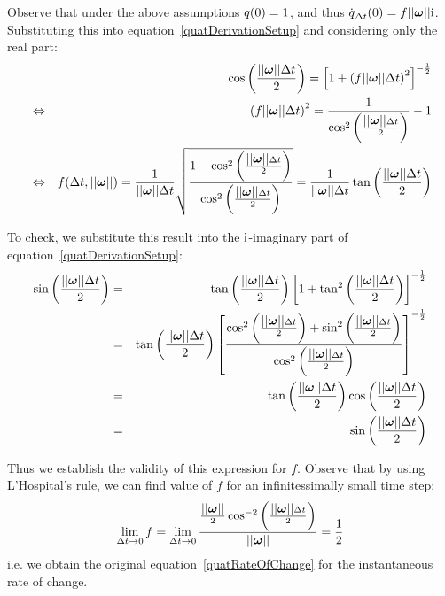 Observe that under the above assumptions $\mbox{$q$}(0) = 1$, and thus
$\dot{\q{q}}_{\Delta t}(0) = f \norm{\ve{\omega}} \qi$. Substituting this
into equation~\ref{quatDerivationSetup} and considering only the real part:
\begin{eqnarray*}
&& \cos\left(\frac{\norm{\ve{\omega}}\Delta t}{2}\right) =
    \left[1 + \left( f \norm{\ve{\omega}}\Delta t \right)^2 \right]^{-\frac{1}{2}} \\
&\Leftrightarrow&
    \left( f \norm{\ve{\omega}}\Delta t \right)^2 =
    \frac{1}{\cos^2\left(\frac{\norm{\ve{\omega}}\Delta t}{2}\right)} - 1 \\
&\Leftrightarrow&
    f(\Delta t, \norm{\ve{\omega}}) =
    \frac{1}{\norm{\ve{\omega}}\Delta t} \sqrt{\frac{
        1 - \cos^2\left(\frac{\norm{\ve{\omega}}\Delta t}{2}\right)}{
        \cos^2\left(\frac{\norm{\ve{\omega}}\Delta t}{2}\right)}} =
    \frac{1}{\norm{\ve{\omega}}\Delta t}
        \tan\left(\frac{\norm{\ve{\omega}}\Delta t}{2}\right)
\end{eqnarray*}

To check, we substitute this result into the $\mbox{$\mathrm{i}$}$-imaginary part of
equation~\ref{quatDerivationSetup}:
\begin{eqnarray*}
\sin\left(\frac{\norm{\ve{\omega}}\Delta t}{2}\right) & = &
    \tan\left(\frac{\norm{\ve{\omega}}\Delta t}{2}\right)
    \left[ 1 + \tan^2\left(\frac{\norm{\ve{\omega}}\Delta t}{2}\right)
    \right]^{-\frac{1}{2}} \\
&=& \tan\left(\frac{\norm{\ve{\omega}}\Delta t}{2}\right)
    \left[ \frac{\cos^2\left(\frac{\norm{\ve{\omega}}\Delta t}{2}\right) +
    \sin^2\left(\frac{\norm{\ve{\omega}}\Delta t}{2}\right) }{
    \cos^2\left(\frac{\norm{\ve{\omega}}\Delta t}{2}\right) }
    \right]^{-\frac{1}{2}} \\
&=& \tan\left(\frac{\norm{\ve{\omega}}\Delta t}{2}\right)
    \cos\left(\frac{\norm{\ve{\omega}}\Delta t}{2}\right) \\
&=& \sin\left(\frac{\norm{\ve{\omega}}\Delta t}{2}\right)
\end{eqnarray*}

Thus we establish the validity of this expression for $f$. Observe that by using 
L'Hospital's rule, we can find value of $f$ for an infinitessimally small time step:
$$
\lim_{\Delta t \to 0} f = \lim_{\Delta t \to 0} \frac{ \frac{\norm{\ve{\omega}}}{2}
    \cos^{-2}\left(\frac{\norm{\ve{\omega}}\Delta t}{2}\right) }{ \norm{\ve{\omega}} } =
    \frac{1}{2}
$$
i.e. we obtain the original equation~\ref{quatRateOfChange} for the
instantaneous rate of change.

